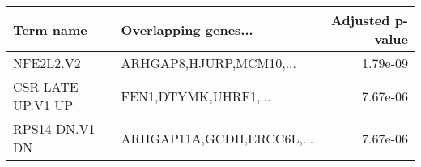 \begin{tabular}{llr}
\toprule
        Term name &      Overlapping genes... &  Adjusted p-value \\
\midrule
        NFE2L2.V2 &   ARHGAP8,HJURP,MCM10,... &          1.79e-09 \\
CSR LATE UP.V1 UP &      FEN1,DTYMK,UHRF1,... &          7.67e-06 \\
   RPS14 DN.V1 DN & ARHGAP11A,GCDH,ERCC6L,... &          7.67e-06 \\
\bottomrule
\end{tabular}
